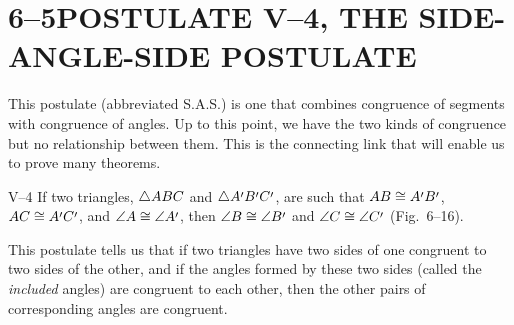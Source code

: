 \documentclass[11pt]{book}
\begin{document}
\section*{6--5\quad POSTULATE V--4, THE SIDE-ANGLE-SIDE POSTULATE}

This postulate (abbreviated S.A.S.) is one that combines congruence of segments
with congruence of angles. Up to this point, we have the two kinds of
congruence but no relationship between them. This is the connecting link that
will enable us to prove many theorems.

\medskip
\noindent
V--4 If two triangles, $\triangle ABC$ and $\tri{A\VIpr B\VIpr C\VIpr}$, are such
that $AB \cong A\VIpr B\VIpr$, $AC \cong A\VIpr C\VIpr$, and $\ang{A} \cong
\ang{A\VIpr}$, then $\ang{B} \cong \ang{B\VIpr}$ and $\ang{C} \cong
\ang{C\VIpr}$ (Fig.~6--16).
\medskip

\FIGVISIXTEEN

This postulate tells us that if two triangles have two sides of one congruent
to two sides of the other, and if the angles formed by these two sides (called
the \emph{included} angles) are congruent to each other, then the other pairs
of corresponding angles are congruent.
\end{document}
